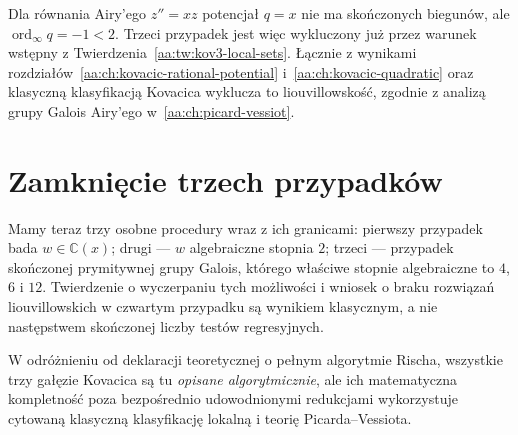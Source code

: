 \begin{przyklad}
\label{aa:prz:kov3-airy}
Dla równania Airy'ego
$z''=xz$ potencjał
$q=x$ nie ma skończonych
biegunów, ale
$\operatorname{ord}_{\infty}q=-1<2$.
Trzeci przypadek jest więc
wykluczony już przez
warunek wstępny z
Twierdzenia~\ref{aa:tw:kov3-local-sets}.
Łącznie z wynikami
rozdziałów~\ref{aa:ch:kovacic-rational-potential}
i~\ref{aa:ch:kovacic-quadratic}
oraz klasyczną klasyfikacją
Kovacica wyklucza to
liouvillowskość,
zgodnie z analizą
grupy Galois Airy'ego
w~\ref{aa:ch:picard-vessiot}.
\end{przyklad}

\section{Zamknięcie trzech przypadków}

Mamy teraz trzy osobne
procedury wraz z ich
granicami:
pierwszy przypadek bada
$w\in\mathbb C(x)$;
drugi --- $w$ algebraiczne
stopnia $2$;
trzeci --- przypadek
skończonej prymitywnej
grupy Galois, którego
właściwe stopnie algebraiczne
to $4$, $6$ i $12$.
Twierdzenie o wyczerpaniu
tych możliwości i
wniosek o braku rozwiązań
liouvillowskich w czwartym
przypadku są wynikiem
klasycznym, a nie
następstwem skończonej
liczby testów regresyjnych.

W odróżnieniu od
deklaracji teoretycznej
o pełnym algorytmie Rischa,
wszystkie trzy gałęzie
Kovacica są tu
\emph{opisane algorytmicznie},
ale ich matematyczna
kompletność poza
bezpośrednio udowodnionymi
redukcjami wykorzystuje
cytowaną klasyczną
klasyfikację lokalną
i teorię Picarda--Vessiota.

